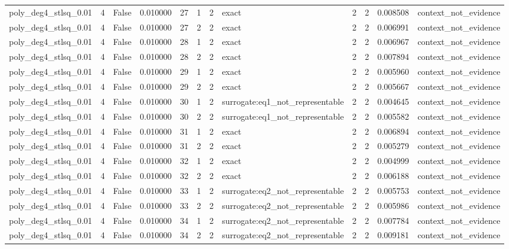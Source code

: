 \begin{tabular}{lrrrrrrlrrrl}
poly\_deg4\_stlsq\_0.01 & 4 & False & 0.010000 & 27 & 1 & 2 & exact & 2 & 2 & 0.008508 & context\_not\_evidence \\
poly\_deg4\_stlsq\_0.01 & 4 & False & 0.010000 & 27 & 2 & 2 & exact & 2 & 2 & 0.006991 & context\_not\_evidence \\
poly\_deg4\_stlsq\_0.01 & 4 & False & 0.010000 & 28 & 1 & 2 & exact & 2 & 2 & 0.006967 & context\_not\_evidence \\
poly\_deg4\_stlsq\_0.01 & 4 & False & 0.010000 & 28 & 2 & 2 & exact & 2 & 2 & 0.007894 & context\_not\_evidence \\
poly\_deg4\_stlsq\_0.01 & 4 & False & 0.010000 & 29 & 1 & 2 & exact & 2 & 2 & 0.005960 & context\_not\_evidence \\
poly\_deg4\_stlsq\_0.01 & 4 & False & 0.010000 & 29 & 2 & 2 & exact & 2 & 2 & 0.005667 & context\_not\_evidence \\
poly\_deg4\_stlsq\_0.01 & 4 & False & 0.010000 & 30 & 1 & 2 & surrogate:eq1\_not\_representable & 2 & 2 & 0.004645 & context\_not\_evidence \\
poly\_deg4\_stlsq\_0.01 & 4 & False & 0.010000 & 30 & 2 & 2 & surrogate:eq1\_not\_representable & 2 & 2 & 0.005582 & context\_not\_evidence \\
poly\_deg4\_stlsq\_0.01 & 4 & False & 0.010000 & 31 & 1 & 2 & exact & 2 & 2 & 0.006894 & context\_not\_evidence \\
poly\_deg4\_stlsq\_0.01 & 4 & False & 0.010000 & 31 & 2 & 2 & exact & 2 & 2 & 0.005279 & context\_not\_evidence \\
poly\_deg4\_stlsq\_0.01 & 4 & False & 0.010000 & 32 & 1 & 2 & exact & 2 & 2 & 0.004999 & context\_not\_evidence \\
poly\_deg4\_stlsq\_0.01 & 4 & False & 0.010000 & 32 & 2 & 2 & exact & 2 & 2 & 0.006188 & context\_not\_evidence \\
poly\_deg4\_stlsq\_0.01 & 4 & False & 0.010000 & 33 & 1 & 2 & surrogate:eq2\_not\_representable & 2 & 2 & 0.005753 & context\_not\_evidence \\
poly\_deg4\_stlsq\_0.01 & 4 & False & 0.010000 & 33 & 2 & 2 & surrogate:eq2\_not\_representable & 2 & 2 & 0.005986 & context\_not\_evidence \\
poly\_deg4\_stlsq\_0.01 & 4 & False & 0.010000 & 34 & 1 & 2 & surrogate:eq2\_not\_representable & 2 & 2 & 0.007784 & context\_not\_evidence \\
poly\_deg4\_stlsq\_0.01 & 4 & False & 0.010000 & 34 & 2 & 2 & surrogate:eq2\_not\_representable & 2 & 2 & 0.009181 & context\_not\_evidence \\

\end{tabular}
